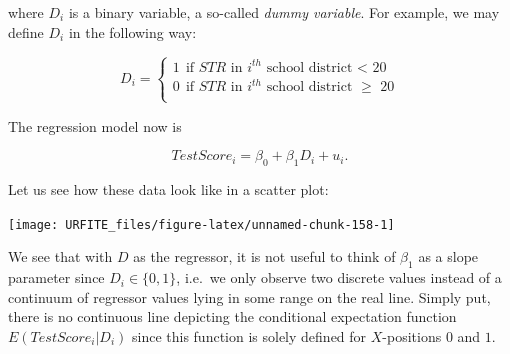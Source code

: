 \documentclass[]{book}
\newenvironment{Shaded}{\begin{snugshade}}{\end{snugshade}}
\newcommand{\KeywordTok}[1]{\textcolor[rgb]{0.13,0.29,0.53}{\textbf{#1}}}
\newcommand{\DataTypeTok}[1]{\textcolor[rgb]{0.13,0.29,0.53}{#1}}
\newcommand{\DecValTok}[1]{\textcolor[rgb]{0.00,0.00,0.81}{#1}}
\newcommand{\FloatTok}[1]{\textcolor[rgb]{0.00,0.00,0.81}{#1}}
\newcommand{\StringTok}[1]{\textcolor[rgb]{0.31,0.60,0.02}{#1}}
\newcommand{\CommentTok}[1]{\textcolor[rgb]{0.56,0.35,0.01}{\textit{#1}}}
\newcommand{\OperatorTok}[1]{\textcolor[rgb]{0.81,0.36,0.00}{\textbf{#1}}}
\newcommand{\NormalTok}[1]{#1}
\theoremstyle{definition}
\theoremstyle{definition}
\theoremstyle{definition}
\theoremstyle{remark}
\begin{document}
where \(D_i\) is a binary variable, a so-called \emph{dummy variable}.
For example, we may define \(D_i\) in the following way:

\[ D_i = \begin{cases}
        1 \ \ \text{if $STR$ in $i^{th}$ school district < 20} \\
        0 \ \ \text{if $STR$ in $i^{th}$ school district $\geq$ 20} \\
      \end{cases} \tag{5.3} \]

The regression model now is

\[ TestScore_i = \beta_0 + \beta_1 D_i + u_i. \tag{5.4} \]

Let us see how these data look like in a scatter plot:

\begin{Shaded}
\end{Shaded}

\begin{center}\texttt{[image: URFITE\_files/figure-latex/unnamed-chunk-158-1]} \end{center}

We see that with \(D\) as the regressor, it is not useful to think of
\(\beta_1\) as a slope parameter since \(D_i \in \{0,1\}\), i.e.~we only
observe two discrete values instead of a continuum of regressor values
lying in some range on the real line. Simply put, there is no continuous
line depicting the conditional expectation function
\(E(TestScore_i | D_i)\) since this function is solely defined for
\(X\)-positions \(0\) and \(1\).
\end{document}
